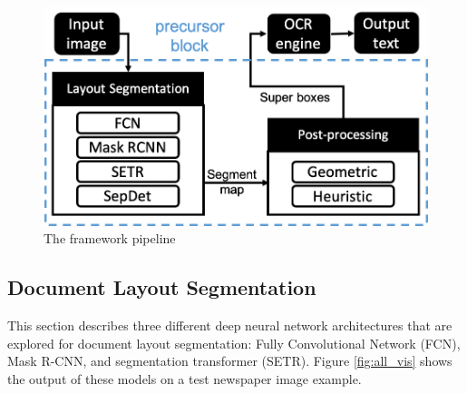 \documentclass[letterpaper]{article} %
\begin{document}

\begin{figure}[h]
   \centering
\includegraphics[scale=0.45]{LaTeX/Figures/block_diagram_v7.png}
   \caption{The framework pipeline}
   \label{fig:block_diagram}
 \end{figure}
 
\subsection{Document Layout Segmentation}
This section describes three different deep neural network architectures that are explored for document layout segmentation: Fully Convolutional Network (FCN), Mask R-CNN, and segmentation transformer (SETR). Figure \ref{fig:all_vis} shows the output of these models on a test newspaper image example.
\end{document}
